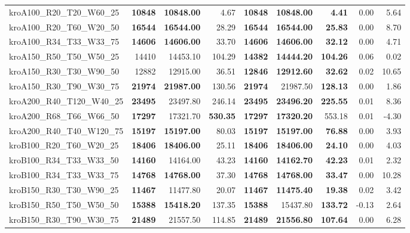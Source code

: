 \documentclass{singlecol-new}
\begin{document}
\begin{scriptsize}
\begin{longtable}{lrrrrrrrr}
		kroA100\_R20\_T20\_W60\_25 & \textbf{10848} & \textbf{10848.00} & 4.67 & \textbf{10848} & \textbf{10848.00} & \textbf{4.41} & 0.00 & 5.64 \\
		kroA100\_R20\_T60\_W20\_50 & \textbf{16544} & \textbf{16544.00} & 28.29 & \textbf{16544} & \textbf{16544.00} & \textbf{25.83} & 0.00 & 8.70 \\
		kroA100\_R34\_T33\_W33\_75 & \textbf{14606} & \textbf{14606.00} & 33.70 & \textbf{14606} & \textbf{14606.00} & \textbf{32.12} & 0.00 & 4.71 \\
		kroA150\_R50\_T50\_W50\_25 & 14410 & 14453.10 & 104.29 & \textbf{14382} & \textbf{14444.20} & \textbf{104.26} & 0.06 & 0.02 \\
		kroA150\_R30\_T30\_W90\_50 & 12882 & 12915.00 & 36.51 & \textbf{12846} & \textbf{12912.60} & \textbf{32.62} & 0.02 & 10.65 \\
		kroA150\_R30\_T90\_W30\_75 & \textbf{21974} & \textbf{21987.00} & 130.56 & \textbf{21974} & 21987.50 & \textbf{128.13} & 0.00 & 1.86 \\
		kroA200\_R40\_T120\_W40\_25 & \textbf{23495} & 23497.80 & 246.14 & \textbf{23495} & \textbf{23496.20} & \textbf{225.55} & 0.01 & 8.36 \\
		kroA200\_R68\_T66\_W66\_50 & \textbf{17297} & 17321.70 & \textbf{530.35} & \textbf{17297} & \textbf{17320.20} & 553.18 & 0.01 & -4.30 \\
		kroA200\_R40\_T40\_W120\_75 & \textbf{15197} & \textbf{15197.00} & 80.03 & \textbf{15197} & \textbf{15197.00} & \textbf{76.88} & 0.00 & 3.93 \\
		kroB100\_R20\_T60\_W20\_25 & \textbf{18406} & \textbf{18406.00} & 25.11 & \textbf{18406} & \textbf{18406.00} & \textbf{24.10} & 0.00 & 4.03 \\
		kroB100\_R34\_T33\_W33\_50 & \textbf{14160} & 14164.00 & 43.23 & \textbf{14160} & \textbf{14162.70} & \textbf{42.23} & 0.01 & 2.32 \\
		kroB100\_R34\_T33\_W33\_75 & \textbf{14768} & \textbf{14768.00} & 37.30 & \textbf{14768} & \textbf{14768.00} & \textbf{33.47} & 0.00 & 10.28 \\
		kroB150\_R30\_T30\_W90\_25 & \textbf{11467} & 11477.80 & 20.07 & \textbf{11467} & \textbf{11475.40} & \textbf{19.38} & 0.02 & 3.42 \\
		kroB150\_R50\_T50\_W50\_50 & \textbf{15388} & \textbf{15418.20} & 137.35 & \textbf{15388} & 15437.80 & \textbf{133.72} & -0.13 & 2.64 \\
		kroB150\_R30\_T90\_W30\_75 & \textbf{21489} & 21557.50 & 114.85 & \textbf{21489} & \textbf{21556.80} & \textbf{107.64} & 0.00 & 6.28 \\

\end{longtable}
\end{scriptsize}
\end{document}
